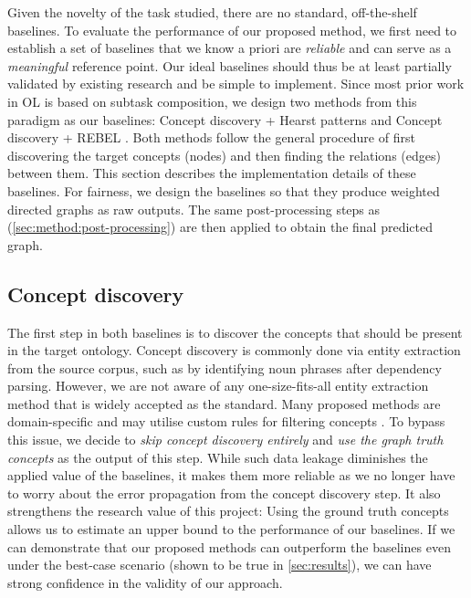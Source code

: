 Given the novelty of the task studied, there are no standard, off-the-shelf baselines. To evaluate the performance of our proposed method, we first need to establish a set of baselines that we know a priori are \emph{reliable} and can serve as a \emph{meaningful} reference point. Our ideal baselines should thus be at least partially validated by existing research and be simple to implement. Since most prior work in OL is based on subtask composition, we design two methods from this paradigm as our baselines: Concept discovery + Hearst patterns \cite{hearst1998automated} and Concept discovery + REBEL \cite{cabot2021rebel}. Both methods follow the general procedure of first discovering the target concepts (nodes) and then finding the relations (edges) between them. This section describes the implementation details of these baselines. For fairness, we design the baselines so that they produce weighted directed graphs as raw outputs. The same post-processing steps as \name (\cref{sec:method:post-processing}) are then applied to obtain the final predicted graph.

\subsection{Concept discovery}

The first step in both baselines is to discover the concepts that should be present in the target ontology. Concept discovery is commonly done via entity extraction from the source corpus, such as by identifying noun phrases after dependency parsing. However, we are not aware of any one-size-fits-all entity extraction method that is widely accepted as the standard. Many proposed methods are domain-specific and may utilise custom rules for filtering concepts \cite{sabou2005learning,cimiano2005text2onto,karoui2004ontology}. To bypass this issue, we decide to \emph{skip concept discovery entirely} and \emph{use the graph truth concepts} as the output of this step. While such data leakage diminishes the applied value of the baselines, it makes them more reliable as we no longer have to worry about the error propagation from the concept discovery step. It also strengthens the research value of this project: Using the ground truth concepts allows us to estimate an upper bound to the performance of our baselines. If we can demonstrate that our proposed methods can outperform the baselines even under the best-case scenario (shown to be true in \cref{sec:results}), we can have strong confidence in the validity of our approach.

